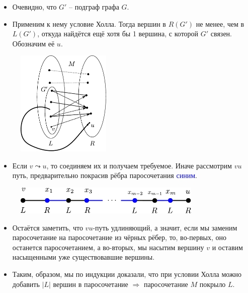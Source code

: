 \begin{frame}[t]
    \begin{itemize}
        \item Очевидно, что $G'$ -- подграф графа $G$.
        \item Применим к нему условие Холла. Тогда вершин в  $R(G')$ не менее, чем в $L(G')$, откуда найдётся ещё хотя бы 1 вершина, с которой $G'$ связен. Обозначим её $u$.
    \end{itemize}

            \begin{figure}[h]
                \centering
                \includegraphics[width=0.4\textwidth]{images/connectivity_hall}
                \label{fig:connectivity_hall}
            \end{figure}
    
\end{frame}

\begin{frame}[t]
    \begin{itemize}
        \item Если $v \leadsto u$, то соединяем их и получаем требуемое. Иначе рассмотрим $vu$ путь, предварительно покрасив рёбра паросочетания \textcolor{blue}{синим}.
    \end{itemize}

    \begin{figure}[h]
        \centering
        \includegraphics[width=0.8\textwidth]{images/longerway}
        \label{fig:longerway}
    \end{figure}

    \begin{itemize}
        \item Остаётся заметить, что $vu$-путь удлиняющий, а значит, если мы заменим паросочетание на паросочетание из чёрных рёбер, то, во-первых, оно останется паросочетанием, а во-вторых, мы насытим вершину $v$ и оставим насыщенными уже существовавшие вершины.
        \item Таким, образом, мы по индукции доказали, что при условии Холла можно добавить $|L|$ вершин в паросочетание $ \Rightarrow$ паросочетание $M$ покрыло $L$. 
            \hfill \qedsymbol{}
    \end{itemize}
\end{frame}
